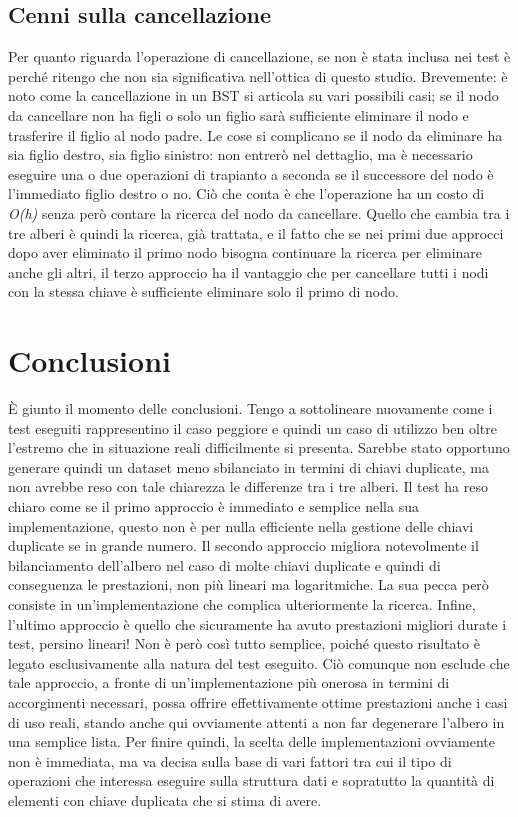 \documentclass{article}
\begin{document}
 

\subsection{Cenni sulla cancellazione}
Per quanto riguarda l'operazione di cancellazione, se non è stata inclusa nei test è perché ritengo che non sia significativa nell'ottica di questo studio.
Brevemente: è noto come la cancellazione in un BST si articola su vari possibili casi; se il nodo da cancellare non ha figli o solo un figlio sarà sufficiente eliminare il nodo e trasferire il figlio al nodo padre. Le cose si complicano se il nodo da eliminare ha sia figlio destro, sia figlio sinistro: non entrerò nel dettaglio, ma è necessario eseguire una o due operazioni di trapianto a seconda se il successore del nodo è l'immediato figlio destro o no. Ciò che conta è che l'operazione ha un costo di \textit{O(h)} senza però contare la ricerca del nodo da cancellare. Quello che cambia tra i tre alberi è quindi la ricerca, già trattata, e il fatto che se nei primi due approcci dopo aver eliminato il primo nodo bisogna continuare la ricerca per eliminare anche gli altri, il terzo approccio ha il vantaggio che per cancellare tutti i nodi  con la stessa chiave è sufficiente eliminare solo il primo di nodo.

\section{Conclusioni}
È giunto il momento delle conclusioni. Tengo a sottolineare nuovamente come i test eseguiti rappresentino il caso peggiore e quindi un caso  di utilizzo ben oltre l'estremo che in situazione reali difficilmente si presenta. Sarebbe stato opportuno generare quindi un dataset meno sbilanciato in termini di chiavi duplicate, ma non avrebbe reso con tale chiarezza le differenze tra i tre alberi. Il test ha reso chiaro come se il primo approccio è immediato e semplice nella sua implementazione, questo non è per nulla efficiente nella gestione delle chiavi duplicate se in grande numero. Il secondo approccio migliora notevolmente il bilanciamento dell'albero nel caso di molte chiavi duplicate e quindi di conseguenza le prestazioni, non più lineari ma logaritmiche. La sua pecca però consiste in un'implementazione che complica ulteriormente la ricerca.
Infine, l'ultimo approccio è quello che sicuramente ha avuto prestazioni migliori durate i test, persino lineari!  Non è però così tutto semplice, poiché questo risultato è legato esclusivamente alla natura del test eseguito. Ciò comunque non esclude che tale approccio, a fronte di un'implementazione più onerosa in termini di accorgimenti necessari, possa offrire effettivamente ottime prestazioni anche i casi di uso reali, stando anche qui ovviamente attenti a non far degenerare l'albero in una semplice lista.
Per finire quindi, la scelta delle implementazioni ovviamente non è immediata, ma va decisa sulla base di vari fattori tra cui il tipo di operazioni che interessa eseguire sulla struttura dati e sopratutto la quantità di elementi con chiave duplicata che si stima di avere. 
\end{document}
